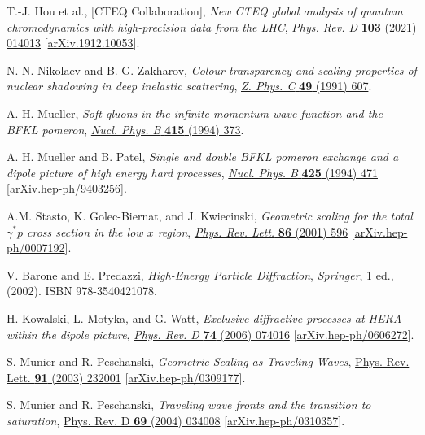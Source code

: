 \documentclass[12pt]{article}
\begin{document}
\begin{thebibliography}{99}
T.-J. Hou et al., [CTEQ Collaboration], \emph{New CTEQ global analysis of quantum chromodynamics with high-precision data from the LHC},
\href{https://doi.org/10.1103/PhysRevD.103.014013}{\emph{Phys. Rev. D} {\bf 103} (2021) 014013}
[\href{https://doi.org/10.48550/arXiv.1912.10053}{arXiv.1912.10053}].

N. N. Nikolaev and B. G. Zakharov, \emph{Colour transparency and scaling properties of nuclear shadowing in deep inelastic scattering}, \href{https://doi.org/10.1007/BF01483577}{\emph{Z. Phys. C} {\bf 49} (1991) 607}.

A. H. Mueller, \emph{Soft gluons in the infinite-momentum wave function and the BFKL pomeron}, \href{https://doi.org/10.1016/0550-3213(94)90116-3}{\emph{Nucl. Phys. B} {\bf 415} (1994) 373}.

A. H. Mueller and B. Patel, \emph{Single and double BFKL pomeron exchange and a dipole picture of high energy hard processes}, \href{https://doi.org/10.1016/0550-3213(94)90284-4}{\emph{Nucl. Phys. B} {\bf 425} (1994) 471} [\href{https://doi.org/10.48550/arXiv.hep-ph/9403256}{arXiv.hep-ph/9403256}].

A.M. Stasto, K. Golec-Biernat, and J. Kwiecinski, \emph{Geometric scaling for the total $\gamma^{\ast} p$ cross section in the low $x$ region}, \href{https://doi.org/10.1103/PhysRevLett.86.596}{\emph{Phys. Rev. Lett.} {\bf 86} (2001) 596}
[\href{https://doi.org/10.48550/arXiv.hep-ph/0007192}{arXiv.hep-ph/0007192}].

V. Barone and E. Predazzi, \emph{High-Energy Particle Diffraction}, \emph{Springer}, 1 ed., (2002). ISBN 978-3540421078.

H. Kowalski, L. Motyka, and G. Watt, \emph{Exclusive diffractive processes at HERA within the dipole picture}, \href{https://doi.org/10.1103/PhysRevD.74.074016}{\emph{Phys. Rev. D} {\bf 74} (2006) 074016}
[\href{https://doi.org/10.48550/arXiv.hep-ph/0606272}{arXiv.hep-ph/0606272}].

S. Munier and R. Peschanski, \emph{Geometric Scaling as Traveling Waves}, \href{https://doi.org/10.1103/PhysRevLett.91.232001}{Phys. Rev. Lett. {\bf91} (2003) 232001} [\href{https://doi.org/10.48550/arXiv.hep-ph/0309177}{arXiv.hep-ph/0309177}].

S. Munier and R. Peschanski, \emph{Traveling wave fronts and the transition to saturation}, \href{https://doi.org/10.1103/PhysRevD.69.034008}{Phys. Rev. D {\bf69} (2004) 034008} [\href{https://doi.org/10.48550/arXiv.hep-ph/0310357}{arXiv.hep-ph/0310357}].


\end{thebibliography}
\end{document}

